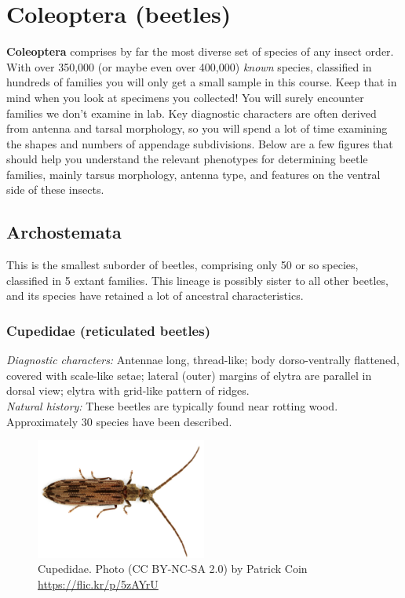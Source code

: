 \documentclass[letterpaper, 11pt]{article}
\begin{document}
\section{Coleoptera (beetles)}
\textbf{Coleoptera} comprises by far the most diverse set of species of any insect order. With over 350,000 (or maybe even over 400,000) \textit{known} species, classified in hundreds of families you will only get a small sample in this course. Keep that in mind when you look at specimens you collected! You will surely encounter families we don't examine in lab. Key diagnostic characters are often derived from antenna and tarsal morphology, so you will spend a lot of time examining the shapes and numbers of appendage subdivisions. Below are a few figures that should help you understand the relevant phenotypes for determining beetle families, mainly tarsus morphology, antenna type, and features on the ventral side of these insects.

\subsection{Archostemata}
This is the smallest suborder of beetles, comprising only 50 or so species, classified in 5 extant families. This lineage is possibly sister to all other beetles, and its species have retained a lot of ancestral characteristics.

\subsubsection{Cupedidae (reticulated beetles)}
\noindent{}\textit{Diagnostic characters:} Antennae long, thread-like; body dorso-ventrally flattened, covered with scale-like setae; lateral (outer) margins of elytra are parallel in dorsal view; elytra with grid-like pattern of ridges.\\

\noindent{}\textit{Natural history:} These beetles are typically found near rotting wood. Approximately 30 species have been described.

\begin{figure}[ht!]
  \centering
    \includegraphics[width=0.5\textwidth]{CupedidHabitus}
  \caption{Cupedidae. Photo (CC BY-NC-SA 2.0) by Patrick Coin \url{https://flic.kr/p/5zAYrU}}
  \label{fig:cupedid}
\end{figure}
\end{document}
